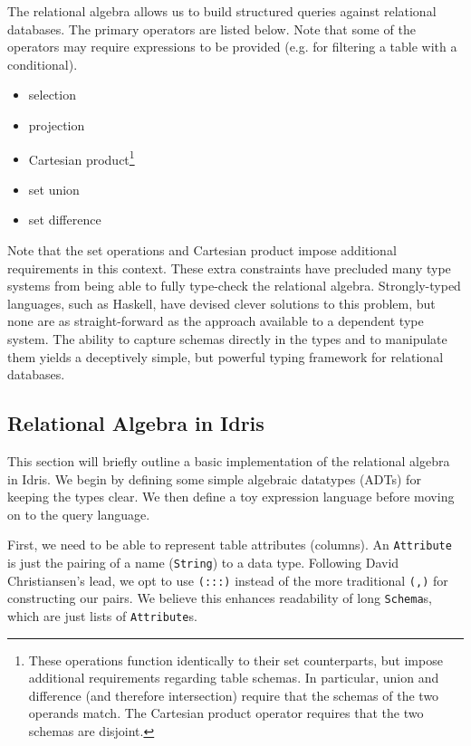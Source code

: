 \documentclass[12pt]{article}
\begin{document}
The relational algebra allows us to build structured queries against relational databases.
The primary operators are listed below.
Note that some of the operators may require expressions to be provided (e.g. for filtering a table with a conditional).

\begin{itemize}
    \item selection
    \item projection
    \item Cartesian product\footnote{\label{fn:set_ops} These operations function identically to their set counterparts, but impose additional requirements regarding table schemas. In particular, union and difference (and therefore intersection) require that the schemas of the two operands match. The Cartesian product operator requires that the two schemas are disjoint.}
    \item set union\footnotemark[\ref{fn:set_ops}]
    \item set difference\footnotemark[\ref{fn:set_ops}]
\end{itemize}

Note that the set operations and Cartesian product impose additional requirements in this context.
These extra constraints have precluded many type systems from being able to fully type-check the relational algebra.
Strongly-typed languages, such as Haskell, have devised clever solutions to this problem, but none are as straight-forward as the approach available to a dependent type system.
The ability to capture schemas directly in the types and to manipulate them yields a deceptively simple, but powerful typing framework for relational databases.

\subsection{Relational Algebra in Idris}

This section will briefly outline a basic implementation of the relational algebra in Idris.
We begin by defining some simple algebraic datatypes (ADTs) for keeping the types clear.
We then define a toy expression language before moving on to the query language.

First, we need to be able to represent table attributes (columns).
An \texttt{Attribute} is just the pairing of a name (\texttt{String}) to a data type.
Following David Christiansen's lead, we opt to use \texttt{(:::)} instead of the more traditional \texttt{(,)} for constructing our pairs.
We believe this enhances readability of long \texttt{Schema}s, which are just lists of \texttt{Attribute}s.
\end{document}
